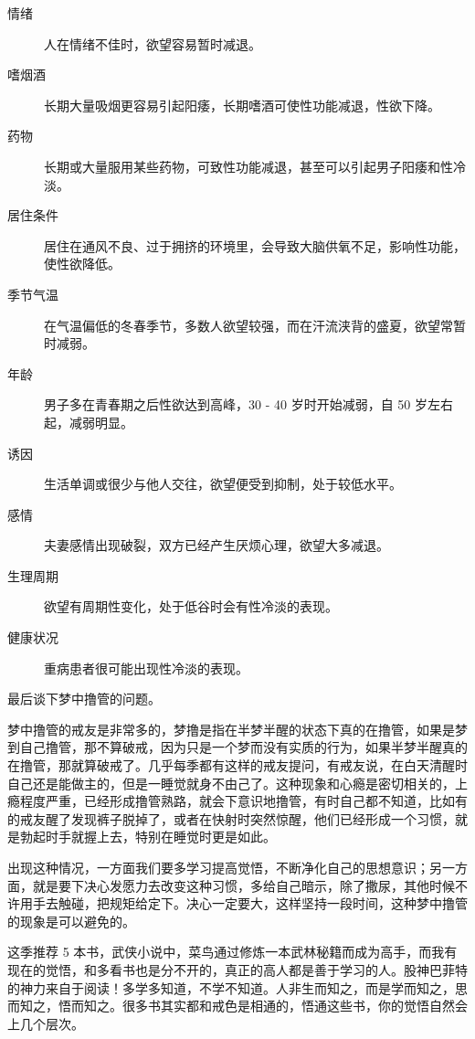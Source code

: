 \documentclass{ctexart}
\begin{document}
\begin{description}
    \item[情绪] 人在情绪不佳时，欲望容易暂时减退。
    \item[嗜烟酒] 长期大量吸烟更容易引起阳痿，长期嗜酒可使性功能减退，性欲下降。
    \item[药物] 长期或大量服用某些药物，可致性功能减退，甚至可以引起男子阳痿和性冷淡。
    \item[居住条件] 居住在通风不良、过于拥挤的环境里，会导致大脑供氧不足，影响性功能，使性欲降低。
    \item[季节气温] 在气温偏低的冬春季节，多数人欲望较强，而在汗流浃背的盛夏，欲望常暂时减弱。
    \item[年龄] 男子多在青春期之后性欲达到高峰，30 - 40 岁时开始减弱，自 50 岁左右起，减弱明显。
    \item[诱因] 生活单调或很少与他人交往，欲望便受到抑制，处于较低水平。
    \item[感情] 夫妻感情出现破裂，双方已经产生厌烦心理，欲望大多减退。
    \item[生理周期] 欲望有周期性变化，处于低谷时会有性冷淡的表现。
    \item[健康状况] 重病患者很可能出现性冷淡的表现。
\end{description}

最后谈下梦中撸管的问题。

梦中撸管的戒友是非常多的，梦撸是指在半梦半醒的状态下真的在撸管，如果是梦到自己撸管，那不算破戒，因为只是一个梦而没有实质的行为，如果半梦半醒真的在撸管，那就算破戒了。几乎每季都有这样的戒友提问，有戒友说，在白天清醒时自己还是能做主的，但是一睡觉就身不由己了。这种现象和心瘾是密切相关的，上瘾程度严重，已经形成撸管熟路，就会下意识地撸管，有时自己都不知道，比如有的戒友醒了发现裤子脱掉了，或者在快射时突然惊醒，他们已经形成一个习惯，就是勃起时手就握上去，特别在睡觉时更是如此。

出现这种情况，一方面我们要多学习提高觉悟，不断净化自己的思想意识；另一方面，就是要下决心发愿力去改变这种习惯，多给自己暗示，除了撒尿，其他时候不许用手去触碰，把规矩给定下。决心一定要大，这样坚持一段时间，这种梦中撸管的现象是可以避免的。

这季推荐 5 本书，武侠小说中，菜鸟通过修炼一本武林秘籍而成为高手，而我有现在的觉悟，和多看书也是分不开的，真正的高人都是善于学习的人。股神巴菲特的神力来自于阅读！多学多知道，不学不知道。人非生而知之，而是学而知之，思而知之，悟而知之。很多书其实都和戒色是相通的，悟通这些书，你的觉悟自然会上几个层次。
\end{document}
